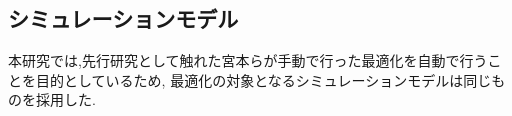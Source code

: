 \subsection{シミュレーションモデル}
本研究では,先行研究として触れた宮本らが手動で行った最適化を自動で行うことを目的としているため,
最適化の対象となるシミュレーションモデルは同じものを採用した.




